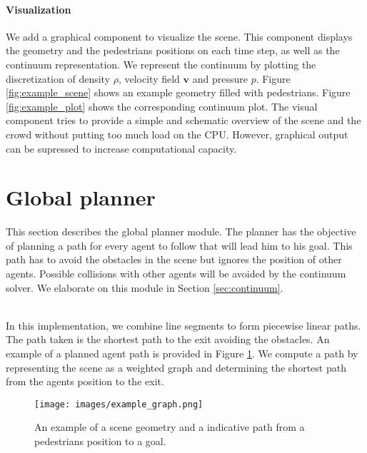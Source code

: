\documentclass{article}
\renewcommand{\vec}[1]{\mathbf{#1}}
\begin{document}
\paragraph{Visualization}
We add a graphical component to visualize the scene. This component displays the geometry and the pedestrians positions on each time step, as well as the continuum representation. We represent the continuum by plotting the discretization of density $\rho$, velocity field $\vec{v}$ and pressure $p$. Figure \ref{fig:example_scene} shows an example geometry filled with pedestrians. Figure \ref{fig:example_plot} shows the corresponding continuum plot. 
The visual component tries to provide a simple and schematic overview of the scene and the crowd without putting too much load on the CPU. However, graphical output can be supressed to increase computational capacity.
\newpage

\section{Global planner}
This section describes the global planner module. The planner has the objective of planning a path for every agent to follow that will lead him to his goal. This path has to avoid the obstacles in the scene but ignores the position of other agents. Possible collisions with other agents will be avoided by the continuum solver. We elaborate on this module in Section \ref{sec:continuum}.

\ \\
In this implementation, we combine line segments to form piecewise linear paths. The path taken is the shortest path to the exit avoiding the obstacles. An example of a planned agent path is provided in Figure \ref{fig:example_path}. We compute a path by representing the scene as a weighted graph and determining the shortest path from the agents position to the exit.
\begin{figure}[h]
	\centering
	\texttt{[image: images/example\_graph.png]}
	\caption{An example of a scene geometry and a indicative path from a pedestrians position to a goal.}
	\label{fig:example_path}
\end{figure}
\end{document}
